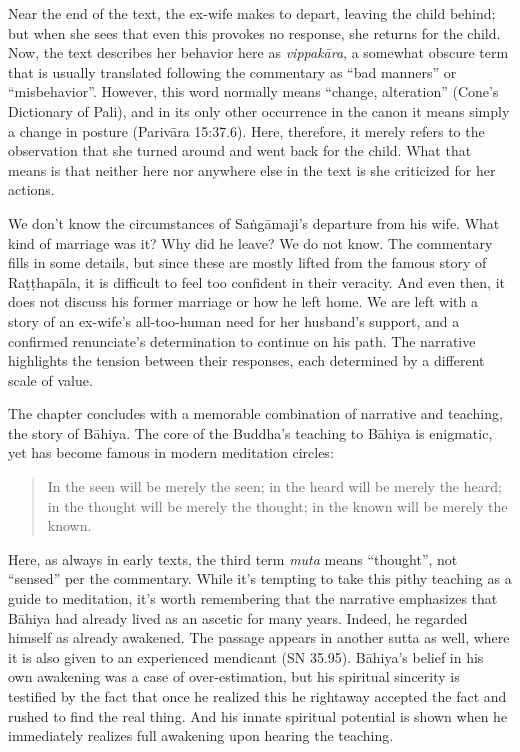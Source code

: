 \documentclass[12pt,openany]{book}%
\begin{document}
Near the end of the text, the ex-wife makes to depart, leaving the child behind; but when she sees that even this provokes no response, she returns for the child. Now, the text describes her behavior here as \textit{\textsanskrit{vippakāra}}, a somewhat obscure term that is usually translated following the commentary as “bad manners” or “misbehavior”. However, this word normally means “change, alteration” (Cone’s Dictionary of Pali), and in its only other occurrence in the canon it means simply a change in posture (\textsanskrit{Parivāra} 15:37.6). Here, therefore, it merely refers to the observation that she turned around and went back for the child. What that means is that neither here nor anywhere else in the text is she criticized for her actions.

We don’t know the circumstances of \textsanskrit{Saṅgāmaji}’s departure from his wife. What kind of marriage was it? Why did he leave? We do not know. The commentary fills in some details, but since these are mostly lifted from the famous story of \textsanskrit{Raṭṭhapāla}, it is difficult to feel too confident in their veracity. And even then, it does not discuss his former marriage or how he left home. We are left with a story of an ex-wife’s all-too-human need for her husband’s support, and a confirmed renunciate’s determination to continue on his path. The narrative highlights the tension between their responses, each determined by a different scale of value. 

The chapter concludes with a memorable combination of narrative and teaching, the story of \textsanskrit{Bāhiya}. The core of the Buddha’s teaching to \textsanskrit{Bāhiya} is enigmatic, yet has become famous in modern meditation circles:

\begin{quotation}%
In the seen will be merely the seen; in the heard will be merely the heard; in the thought will be merely the thought; in the known will be merely the known.

%
\end{quotation}

Here, as always in early texts, the third term \textit{muta} means “thought”, not “sensed” per the commentary. While it’s tempting to take this pithy teaching as a guide to meditation, it’s worth remembering that the narrative emphasizes that \textsanskrit{Bāhiya} had already lived as an ascetic for many years. Indeed, he regarded himself as already awakened. The passage appears in another sutta as well, where it is also given to an experienced mendicant (SN 35.95). \textsanskrit{Bāhiya}’s belief in his own awakening was a case of over-estimation, but his spiritual sincerity is testified by the fact that once he realized this he rightaway accepted the fact and rushed to find the real thing. And his innate spiritual potential is shown when he immediately realizes full awakening upon hearing the teaching.
\end{document}
